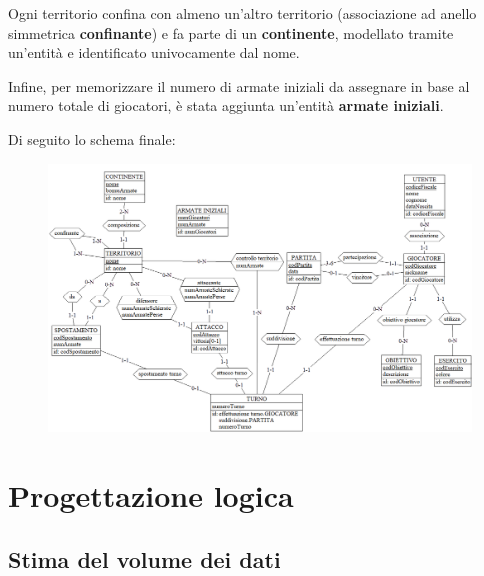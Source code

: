 \documentclass[a4paper,12pt]{report}
\begin{document}
Ogni territorio confina con almeno un’altro territorio (associazione ad anello simmetrica \textbf{confinante}) e fa parte di un \textbf{continente}, modellato tramite un’entità e identificato univocamente dal nome. \par
Infine, per memorizzare il numero di armate iniziali da assegnare in base al numero totale di giocatori, è stata aggiunta un’entità \textbf{armate iniziali}. \par
Di seguito lo schema finale:
\begin{figure}[H]
\centering{}
\begin{center}
\includegraphics[width=\textwidth]{img/report/finale.png}
\end{center}
\label{img:turno_par}
\end{figure}

\chapter{Progettazione logica}
\section{Stima del volume dei dati}
\end{document}
